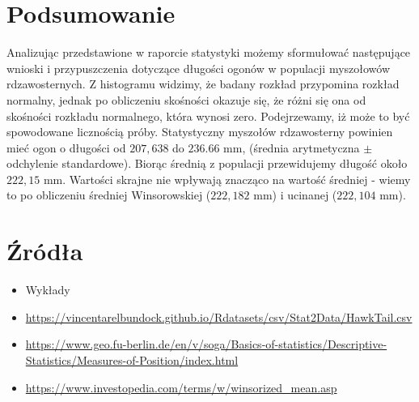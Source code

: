\documentclass{article}
\theoremstyle{break}
\begin{document}
	\section{Podsumowanie}
Analizując przedstawione w raporcie statystyki możemy sformułować następujące wnioski i przypuszczenia dotyczące długości ogonów w populacji myszołowów rdzawosternych. Z histogramu widzimy, że badany rozkład przypomina rozkład normalny, jednak po obliczeniu skośności okazuje się, że różni się ona od skośności rozkładu normalnego, która wynosi zero. Podejrzewamy, iż może to być spowodowane licznością próby. Statystyczny myszołów rdzawosterny powinien mieć ogon o długości od $207,638$ do $236.66$ mm, (średnia arytmetyczna $\pm$ odchylenie standardowe). Biorąc średnią z populacji przewidujemy długość około $222,15$ mm. Wartości skrajne nie wpływają znacząco na wartość średniej - wiemy to po obliczeniu średniej Winsorowskiej ($222,182$ mm) i ucinanej ($222,104$ mm). 

\section{Źródła}
\begin{itemize}
	\item Wykłady
	\item \url{https://vincentarelbundock.github.io/Rdatasets/csv/Stat2Data/HawkTail.csv}
	\item \url{https://www.geo.fu-berlin.de/en/v/soga/Basics-of-statistics/Descriptive-Statistics/Measures-of-Position/index.html}
	\item \url{https://www.investopedia.com/terms/w/winsorized_mean.asp}
\end{itemize}

	
\end{document}
